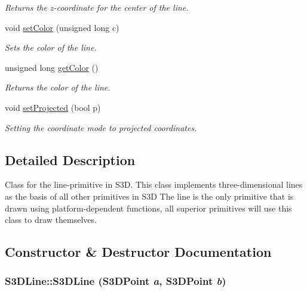 \begin{DoxyCompactItemize}
\begin{DoxyCompactList}\small\item\em Returns the z-\/coordinate for the center of the line. \item\end{DoxyCompactList}\item 
void \hyperlink{class_s3_d_line_a9feaf056477e858a7b0248a7b5cdd222}{setColor} (unsigned long c)
\begin{DoxyCompactList}\small\item\em Sets the color of the line. \item\end{DoxyCompactList}\item 
unsigned long \hyperlink{class_s3_d_line_a62b49873ae3356cf997ca1fd87a1b7de}{getColor} ()
\begin{DoxyCompactList}\small\item\em Returns the color of the line. \item\end{DoxyCompactList}\item 
void \hyperlink{class_s3_d_line_a3b973e5206d4bed73b797b4c5afe8dec}{setProjected} (bool p)
\begin{DoxyCompactList}\small\item\em Setting the coordinate mode to projected coordinates. \item\end{DoxyCompactList}\end{DoxyCompactItemize}


\subsection{Detailed Description}
Class for the line-\/primitive in S3D. This class implements three-\/dimensional lines as the basis of all other primitives in S3D The line is the only primitive that is drawn using platform-\/dependent functions, all superior primitives will use this class to draw themselves. 

\subsection{Constructor \& Destructor Documentation}
\hypertarget{class_s3_d_line_ae6eeda40b82f27193b1d1165a8fb3e63}{
\subsubsection[{S3DLine}]{\setlength{\rightskip}{0pt plus 5cm}S3DLine::S3DLine ({\bf S3DPoint} {\em a}, \/  {\bf S3DPoint} {\em b})}}
\label{class_s3_d_line_ae6eeda40b82f27193b1d1165a8fb3e63}



